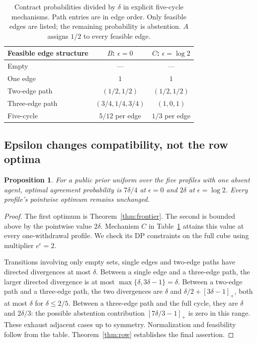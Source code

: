 \documentclass[sigconf,nonacm]{aamas}
\newtheorem{proposition}[theorem]{Proposition}
\begin{document}
\begin{table}[t]
\centering
\caption{Contract probabilities divided by $\delta$ in explicit five-cycle mechanisms. Path entries are in edge order. Only feasible edges are listed; the remaining probability is abstention. $A$ assigns $1/2$ to every feasible edge.}
\label{tab:mechanisms}
\begin{tabular}{lcc}
\toprule
Feasible edge structure & $B$: $\epsilon=0$ & $C$: $\epsilon=\log2$\\
\midrule
Empty & --- & ---\\
One edge & $1$ & $1$\\
Two-edge path & $(1/2,1/2)$ & $(1/2,1/2)$\\
Three-edge path & $(3/4,1/4,3/4)$ & $(1,0,1)$\\
Five-cycle & $5/12$ per edge & $1/3$ per edge\\
\bottomrule
\end{tabular}
\end{table}

\subsection{Epsilon changes compatibility, not the row optima}
\begin{proposition}\label{prop:epsilon}
For a public prior uniform over the five profiles with one absent agent, optimal agreement probability is $7\delta/4$ at $\epsilon=0$ and $2\delta$ at $\epsilon=\log2$. Every profile's pointwise optimum remains unchanged.
\end{proposition}
\begin{proof}
The first optimum is Theorem~\ref{thm:frontier}. The second is bounded above by the pointwise value $2\delta$. Mechanism $C$ in Table~\ref{tab:mechanisms} attains this value at every one-withdrawal profile. We check its DP constraints on the full cube using multiplier $e^\epsilon=2$.

Transitions involving only empty sets, single edges and two-edge paths have directed divergences at most $\delta$. Between a single edge and a three-edge path, the larger directed divergence is at most $\max\{\delta,3\delta-1\}=\delta$. Between a two-edge path and a three-edge path, the two divergences are $\delta$ and $\delta/2+[3\delta-1]_+$, both at most $\delta$ for $\delta\leq2/5$. Between a three-edge path and the full cycle, they are $\delta$ and $2\delta/3$: the possible abstention contribution $[7\delta/3-1]_+$ is zero in this range. These exhaust adjacent cases up to symmetry. Normalization and feasibility follow from the table. Theorem~\ref{thm:row} establishes the final assertion.
\end{proof}
\end{document}
